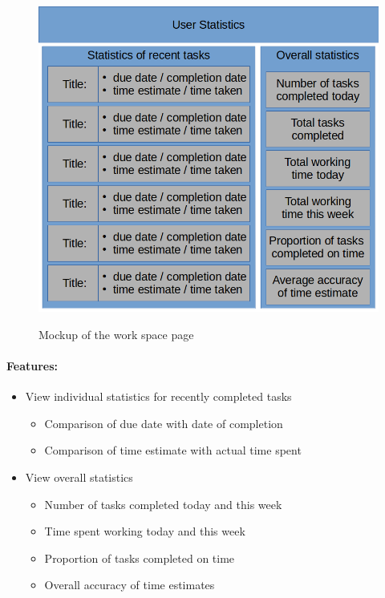 \documentclass{article}
\begin{document}
\begin{minipage}{0.5\textwidth}
	\begin{figure}[H]
		\includegraphics[width=\linewidth]{Mockups/statistics.png}
		\label{fig:statistics_mockup}
		\caption{Mockup of the work space page}
	\end{figure}
\end{minipage} \hfill
\begin{minipage}{0.45\textwidth}
	\paragraph{Features:}
	\begin{samepage}
		\begin{itemize}
			\item View individual statistics for recently completed tasks
			      \begin{samepage}
				      \begin{itemize}
					      \item Comparison of due date with date of completion
					      \item Comparison of time estimate with actual time spent
				      \end{itemize}
			      \end{samepage}
			\item View overall statistics
			      \begin{samepage}
				      \begin{itemize}
					      \item Number of tasks completed today and this week
					      \item Time spent working today and this week
					      \item Proportion of tasks completed on time
					      \item Overall accuracy of time estimates
				      \end{itemize}
			      \end{samepage}
		\end{itemize}
	\end{samepage}
\end{minipage}
\end{document}
